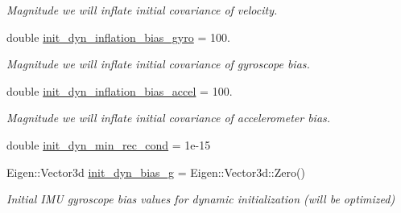 \begin{DoxyCompactItemize}
\begin{DoxyCompactList}\small\item\em Magnitude we will inflate initial covariance of velocity. \end{DoxyCompactList}\item 
\mbox{\label{structov__init_1_1InertialInitializerOptions_a185fc9aa3073561ac95e3bf9d421e083}} 
double \hyperlink{structov__init_1_1InertialInitializerOptions_a185fc9aa3073561ac95e3bf9d421e083}{init\+\_\+dyn\+\_\+inflation\+\_\+bias\+\_\+gyro} = 100.
\begin{DoxyCompactList}\small\item\em Magnitude we will inflate initial covariance of gyroscope bias. \end{DoxyCompactList}\item 
\mbox{\label{structov__init_1_1InertialInitializerOptions_a4a3e85e21af048ba7922a97098c3f7ab}} 
double \hyperlink{structov__init_1_1InertialInitializerOptions_a4a3e85e21af048ba7922a97098c3f7ab}{init\+\_\+dyn\+\_\+inflation\+\_\+bias\+\_\+accel} = 100.
\begin{DoxyCompactList}\small\item\em Magnitude we will inflate initial covariance of accelerometer bias. \end{DoxyCompactList}\item 
double \hyperlink{structov__init_1_1InertialInitializerOptions_a202ca41d108ae2da322f246f246d0c2a}{init\+\_\+dyn\+\_\+min\+\_\+rec\+\_\+cond} = 1e-\/15
\item 
\mbox{\label{structov__init_1_1InertialInitializerOptions_ac89f312b0f4ed57a1d7b97ca319b6ee6}} 
Eigen\+::\+Vector3d \hyperlink{structov__init_1_1InertialInitializerOptions_ac89f312b0f4ed57a1d7b97ca319b6ee6}{init\+\_\+dyn\+\_\+bias\+\_\+g} = Eigen\+::\+Vector3d\+::\+Zero()
\begin{DoxyCompactList}\small\item\em Initial I\+MU gyroscope bias values for dynamic initialization (will be optimized) \end{DoxyCompactList}\item 
\mbox{\label{structov__init_1_1InertialInitializerOptions_ab810afe7877d06a6154fa4f28d23051d}} 

\end{DoxyCompactItemize}
